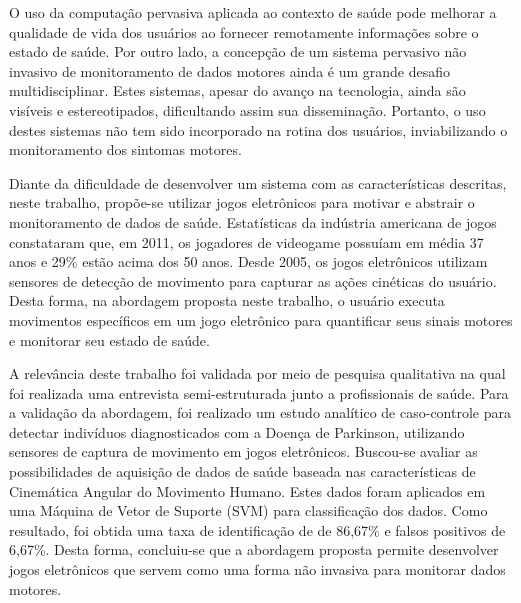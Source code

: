 
O uso da computação pervasiva aplicada ao contexto de saúde pode melhorar a qualidade de vida dos usuários ao fornecer remotamente informações sobre o estado de saúde. Por outro lado, a concepção de um sistema pervasivo não invasivo de monitoramento de dados motores ainda é um grande desafio multidisciplinar. Estes sistemas, apesar do avanço na tecnologia, ainda são visíveis e estereotipados, dificultando assim sua disseminação. Portanto, o uso destes sistemas não tem sido incorporado na rotina dos usuários, inviabilizando o monitoramento dos sintomas motores.
 
Diante da dificuldade de desenvolver um sistema com as características descritas, neste trabalho, propõe-se utilizar jogos eletrônicos para motivar e abstrair o monitoramento de dados de saúde. Estatísticas da indústria americana de jogos constataram que, em 2011, os jogadores de videogame possuíam em média 37 anos e 29$\%$  estão acima dos 50 anos. Desde 2005, os jogos eletrônicos utilizam sensores de detecção de movimento para capturar as ações cinéticas do usuário. Desta forma, na abordagem proposta neste trabalho, o usuário executa movimentos específicos em um jogo eletrônico para quantificar seus sinais motores e monitorar seu estado de saúde.

A relevância deste trabalho foi validada por meio de pesquisa qualitativa na qual foi realizada uma entrevista semi-estruturada junto a profissionais de saúde. Para a validação da abordagem, foi realizado um estudo analítico de caso-controle para detectar indivíduos diagnosticados com a Doença de Parkinson, utilizando sensores de captura de movimento em jogos eletrônicos. Buscou-se avaliar as possibilidades de aquisição de dados de saúde baseada nas características de Cinemática Angular do Movimento Humano. Estes dados foram aplicados em uma Máquina de Vetor de Suporte (SVM) para classificação dos dados. Como resultado, foi obtida uma taxa de identificação de  de 86,67\% e falsos positivos de 6,67\%. Desta forma, concluiu-se que a abordagem proposta permite desenvolver jogos eletrônicos que servem como uma forma não invasiva para monitorar dados motores.